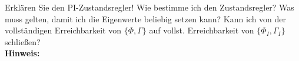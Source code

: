\begin{question}[section=8,name={PI-Zustandsregler 1},difficulty=,type=mdl,tags={}]
	Erklären Sie den PI-Zustandsregler! Wie bestimme ich den Zustandsregler? Was muss gelten, damit ich die Eigenwerte beliebig setzen kann? Kann ich von der vollständigen Erreichbarkeit von $\{\Phi, \Gamma\}$ auf vollst. Erreichbarkeit von $\{\Phi_I,\Gamma_I\}$ schließen?
	\\ \textbf{Hinweis:}\\
	
\end{question}
\begin{solution}
	
\end{solution}